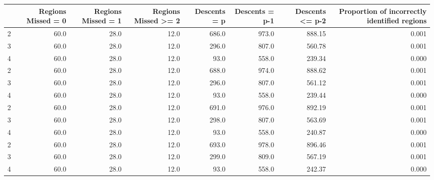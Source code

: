 \begin{tabular}{lrrrrrrr}
\toprule
{} &  Regions Missed = 0 &  Regions Missed = 1 &  Regions Missed >= 2 &  Descents = p &  Descents = p-1 &  Descents <= p-2 &  Proportion of incorrectly identified regions \\
\midrule
2 &                60.0 &                28.0 &                 12.0 &         686.0 &           973.0 &           888.15 &                                         0.001 \\
3 &                60.0 &                28.0 &                 12.0 &         296.0 &           807.0 &           560.78 &                                         0.001 \\
4 &                60.0 &                28.0 &                 12.0 &          93.0 &           558.0 &           239.34 &                                         0.000 \\
2 &                60.0 &                28.0 &                 12.0 &         688.0 &           974.0 &           888.62 &                                         0.001 \\
3 &                60.0 &                28.0 &                 12.0 &         296.0 &           807.0 &           561.12 &                                         0.001 \\
4 &                60.0 &                28.0 &                 12.0 &          93.0 &           558.0 &           239.44 &                                         0.000 \\
2 &                60.0 &                28.0 &                 12.0 &         691.0 &           976.0 &           892.19 &                                         0.001 \\
3 &                60.0 &                28.0 &                 12.0 &         298.0 &           807.0 &           563.69 &                                         0.001 \\
4 &                60.0 &                28.0 &                 12.0 &          93.0 &           558.0 &           240.87 &                                         0.000 \\
2 &                60.0 &                28.0 &                 12.0 &         693.0 &           978.0 &           896.46 &                                         0.001 \\
3 &                60.0 &                28.0 &                 12.0 &         299.0 &           809.0 &           567.19 &                                         0.001 \\
4 &                60.0 &                28.0 &                 12.0 &          93.0 &           558.0 &           242.37 &                                         0.000 \\
\bottomrule
\end{tabular}
